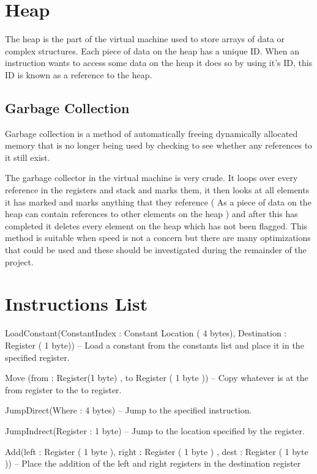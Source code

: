 \documentclass[]{final_report}
\begin{document}
\section{Heap}

The heap is the part of the virtual machine used to store arrays of data or complex structures. Each piece of data on the heap has a unique ID. When an instruction wants to access some data on the heap it does so by using it's ID, this ID is known as a reference to the heap.

\subsection{Garbage Collection}

Garbage collection is a method of automatically freeing dynamically allocated memory that is no longer being used by checking to see whether any references to it still exist.

The garbage collector in the virtual machine is very crude. It loops over every reference in the registers and stack and marks them, it then looks at all elements it has marked and marks anything that they reference ( As a piece of data on the heap can contain references to other elements on the heap ) and after this has completed it deletes every element on the heap which has not been flagged. This method is suitable when speed is not a concern but there are many optimizations that could be used and these should be investigated during the remainder of the project.

\section{Instructions List}

LoadConstant(ConstantIndex : Constant Location ( 4 bytes), Destination : Register ( 1 byte)) – Load a constant from the constants list and place it in the specified register.

Move (from : Register(1 byte) , to Register ( 1 byte )) – Copy whatever is at the from register to the
to register.

JumpDirect(Where : 4 bytes) – Jump to the specified instruction.

JumpIndrect(Register : 1 byte) – Jump to the location specified by the register.

Add(left : Register ( 1 byte ), right : Register ( 1 byte ) , dest : Register ( 1 byte )) – Place the
addition of the left and right registers in the destination register
\end{document}
